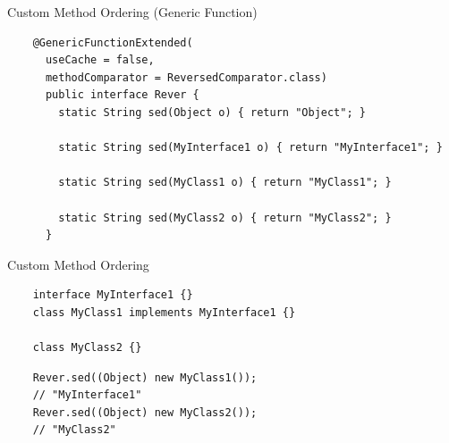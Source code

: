 \documentclass[13pt]{beamer}
\begin{document}
\begin{frame}[fragile]{Custom Method Ordering (Generic Function)}
  \begin{verbatim}
    @GenericFunctionExtended(
      useCache = false,
      methodComparator = ReversedComparator.class)
      public interface Rever {
        static String sed(Object o) { return "Object"; }
      
        static String sed(MyInterface1 o) { return "MyInterface1"; }
    
        static String sed(MyClass1 o) { return "MyClass1"; }

        static String sed(MyClass2 o) { return "MyClass2"; }
      }
  \end{verbatim}
\end{frame}

\begin{frame}[fragile]{Custom Method Ordering}
  
  \begin{verbatim}
    interface MyInterface1 {}
    class MyClass1 implements MyInterface1 {}
    
    class MyClass2 {}
  \end{verbatim}

  \vspace{5mm} %

  \begin{verbatim}
    Rever.sed((Object) new MyClass1());
    // "MyInterface1"
    Rever.sed((Object) new MyClass2());
    // "MyClass2"
  \end{verbatim}
\end{frame}
\end{document}

